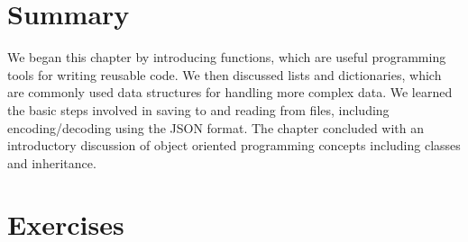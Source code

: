 \documentclass{book}
\begin{document}
\section{Summary}

We began this chapter by introducing functions, which are useful programming tools for writing reusable code. We then discussed lists and dictionaries, which are commonly used data structures for handling more complex data. We learned the basic steps involved in saving to and reading from files, including encoding/decoding using the JSON format. The chapter concluded with an introductory discussion of object oriented programming concepts including classes and inheritance.

\section{Exercises}
\end{document}
